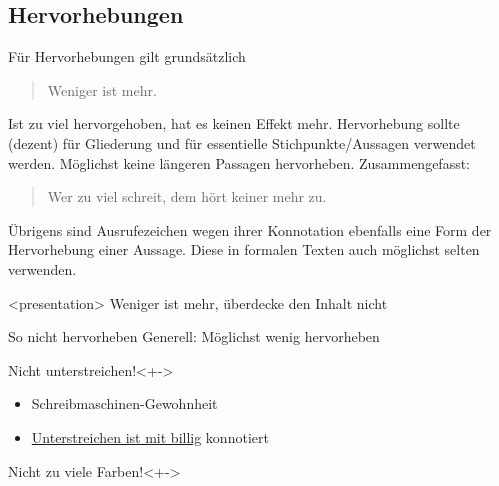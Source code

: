 \subsection{Hervorhebungen}
Für Hervorhebungen gilt grundsätzlich
\begin{quote}
  Weniger ist mehr.
\end{quote}
Ist zu viel hervorgehoben, hat es keinen Effekt mehr. Hervorhebung
sollte (dezent) für Gliederung und für essentielle
Stichpunkte/Aussagen verwendet werden. Möglichst keine längeren
Passagen hervorheben.
Zusammengefasst:
\begin{quote}
  Wer zu viel schreit, dem hört keiner mehr zu.
\end{quote}
Übrigens sind Ausrufezeichen wegen ihrer Konnotation ebenfalls eine
Form der Hervorhebung einer Aussage. Diese in formalen Texten auch
möglichst selten verwenden.

\begin{frame}<presentation>
  \subsectionpage
  \centering
  Weniger ist mehr, überdecke den Inhalt nicht
\end{frame}

\begin{frame}{So nicht hervorheben}
  \alert<presentation><+->{Generell: Möglichst wenig hervorheben}
  \begin{alertblock}{Nicht unterstreichen!}<+->
    \begin{itemize}
    \item Schreibmaschinen-Gewohnheit
    \item \underline{Unterstreichen ist mit billig} konnotiert
    \end{itemize}
  \end{alertblock}
  \begin{alertblock}{Nicht zu viele Farben!}<+->
    \fontsize{14pt}{18pt}\selectfont
  \end{alertblock}
\end{frame}

